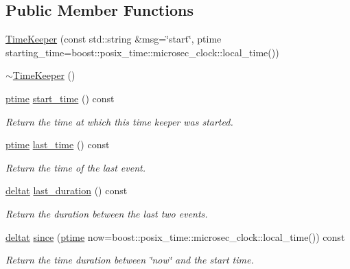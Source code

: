 \subsection*{Public Member Functions}
\begin{DoxyCompactItemize}
\item 
\hyperlink{class_wire_cell_1_1_time_keeper_a71e344c3be3c8fc0e156fb41cb6bb0f4}{Time\+Keeper} (const std\+::string \&msg=\char`\"{}start\char`\"{}, ptime starting\+\_\+time=boost\+::posix\+\_\+time\+::microsec\+\_\+clock\+::local\+\_\+time())
\item 
\hyperlink{class_wire_cell_1_1_time_keeper_aba1d443fcfdba702f0e28031bcad98c8}{$\sim$\+Time\+Keeper} ()
\item 
\hyperlink{class_wire_cell_1_1_time_keeper_a3600404e97a1581a1c2630f92f490603}{ptime} \hyperlink{class_wire_cell_1_1_time_keeper_acbe86e72c4991e0bd5143a59580c5e82}{start\+\_\+time} () const
\begin{DoxyCompactList}\small\item\em Return the time at which this time keeper was started. \end{DoxyCompactList}\item 
\hyperlink{class_wire_cell_1_1_time_keeper_a3600404e97a1581a1c2630f92f490603}{ptime} \hyperlink{class_wire_cell_1_1_time_keeper_a58d3645d65f01238a44978122f388ddc}{last\+\_\+time} () const
\begin{DoxyCompactList}\small\item\em Return the time of the last event. \end{DoxyCompactList}\item 
\hyperlink{class_wire_cell_1_1_time_keeper_a3e7203525811fc9902aab31615d18ad2}{deltat} \hyperlink{class_wire_cell_1_1_time_keeper_aaa411313dc1302f83db8a880b6bbd719}{last\+\_\+duration} () const
\begin{DoxyCompactList}\small\item\em Return the duration between the last two events. \end{DoxyCompactList}\item 
\hyperlink{class_wire_cell_1_1_time_keeper_a3e7203525811fc9902aab31615d18ad2}{deltat} \hyperlink{class_wire_cell_1_1_time_keeper_aefe09a82b5a1c45c9cc5be83301277e4}{since} (\hyperlink{class_wire_cell_1_1_time_keeper_a3600404e97a1581a1c2630f92f490603}{ptime} now=boost\+::posix\+\_\+time\+::microsec\+\_\+clock\+::local\+\_\+time()) const
\begin{DoxyCompactList}\small\item\em Return the time duration between \char`\"{}now\char`\"{} and the start time. \end{DoxyCompactList}\item 

\end{DoxyCompactItemize}
